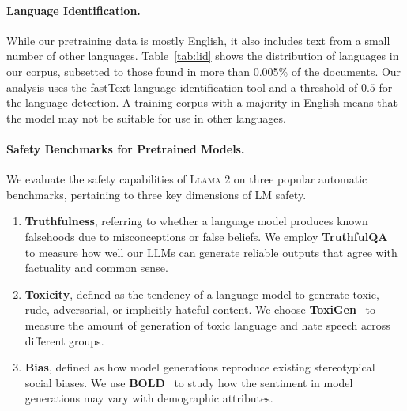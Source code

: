 \paragraph{Language Identification.} While our pretraining data is mostly English, it also includes text from a small number of other languages. Table~\ref{tab:lid} shows the distribution of languages in our corpus, subsetted to those found in more than 0.005\% of the documents. Our analysis uses the fastText \citep{bojanowski2016fasttext} language identification tool and a threshold  of $0.5$ for the language detection. A training corpus with a majority in English means that the model may not be suitable for use in other languages.

\paragraph{Safety Benchmarks for Pretrained Models.} 
\label{sec:safety_pretrain_bench}
We evaluate the safety capabilities of \textsc{Llama 2} on three popular automatic benchmarks, pertaining to three key dimensions of LM safety.

\begin{enumerate}
    \item \textbf{Truthfulness}, referring to whether a language model produces known falsehoods due to misconceptions or false beliefs. We employ \textbf{TruthfulQA}~\citep{lin2021truthfulqa} to measure how well our LLMs can generate reliable outputs that agree with factuality and common sense. 
    \item \textbf{Toxicity}, defined as the tendency of a language model to generate toxic, rude, adversarial, or implicitly hateful content.  We choose \textbf{ToxiGen}~\citep{hartvigsen2022toxigen} to measure the amount of generation of toxic language and hate speech across different groups.
    \item \textbf{Bias}, defined as how model generations reproduce existing stereotypical social biases. We use \textbf{BOLD}~\citep{dhamala2021bold} to study how the sentiment in model generations may vary with demographic attributes.
\end{enumerate}

